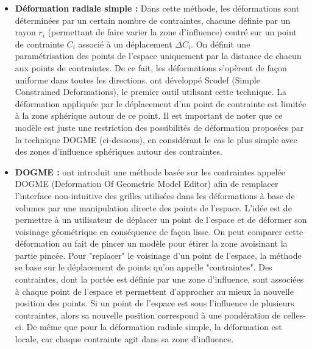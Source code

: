 \begin{itemize}

\item{\textbf{Déformation radiale simple :}} Dans cette méthode, les
déformations sont déterminées par un certain nombre de contraintes, chacune
définie par un rayon $r_i$ (permettant de faire varier la zone d'influence)
centré sur un point de contrainte $C_i$ associé à un déplacement $\Delta C_i$.
On définit une paramétrisation des points de l'espace uniquement par la
distance de chacun aux points de contraintes. De ce fait, les déformations
s'opèrent de façon uniforme dans toutes les directions. \cite{BR94} ont
développé Scodef (Simple Constrained Deformations), le premier outil utilisant
cette technique. La déformation appliquée par le déplacement d'un point de
contrainte est limitée à la zone sphérique autour de ce point. Il est
important de noter que ce modèle est juste une restriction des possibilités de
déformation proposées par la technique DOGME (ci-dessous), en considérant le
cas le plus simple avec des zones d'influence sphériques autour des
contraintes.

\item{\textbf{DOGME :}} \cite{BB91} ont introduit une méthode basée sur les
contraintes appelée DOGME (Deformation Of Geometric Model Editor) afin de
remplacer l'interface non-intuitive des grilles utilisées dans les déformations
à base de volumes par une manipulation directe des points de l'espace. L'idée
est de permettre à un utilisateur de déplacer un point de l'espace et de
déformer son voisinage géométrique en conséquence de façon lisse. On peut
comparer cette déformation au fait de pincer un modèle pour étirer la zone
avoisinant la partie pincée. Pour "replacer" le voisinage d'un point de
l'espace, la méthode se base sur le déplacement de points qu'on appelle
"contraintes". Des contraintes, dont la portée est définie par une
zone d'influence, sont associées à chaque point de l'espace et permettent
d'approcher au mieux la nouvelle position des points. Si un point de l'espace
est sous l'influence de plusieurs contraintes, alors sa nouvelle position
correspond à une pondération de celles-ci. De même que pour la déformation
radiale simple, la déformation est locale, car chaque contrainte agit dans sa
zone d'influence.

\end{itemize}